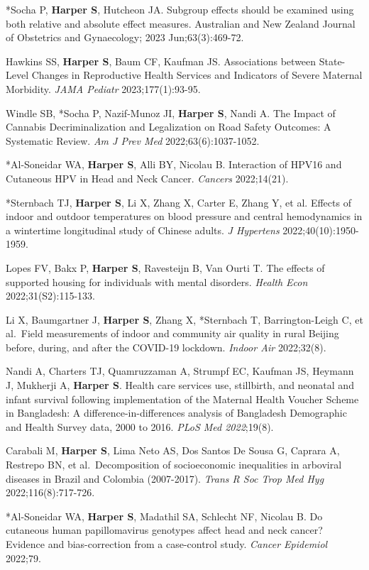 \documentclass[
  letterpaper,
  DIV=11,
  numbers=noendperiod]{scrartcl}
\begin{document}
*Socha P, \textbf{Harper S}, Hutcheon JA. Subgroup effects should be
examined using both relative and absolute effect measures. Australian
and New Zealand Journal of Obstetrics and Gynaecology; 2023
Jun;63(3):469-72.

Hawkins SS, \textbf{Harper S}, Baum CF, Kaufman JS. Associations between
State-Level Changes in Reproductive Health Services and Indicators of
Severe Maternal Morbidity. \emph{JAMA Pediatr} 2023;177(1):93-95.

Windle SB, *Socha P, Nazif-Munoz JI, \textbf{Harper S}, Nandi A. The
Impact of Cannabis Decriminalization and Legalization on Road Safety
Outcomes: A Systematic Review. \emph{Am J Prev Med}
2022;63(6):1037-1052.

*Al-Soneidar WA, \textbf{Harper S}, Alli BY, Nicolau B. Interaction of
HPV16 and Cutaneous HPV in Head and Neck Cancer. \emph{Cancers}
2022;14(21).

*Sternbach TJ, \textbf{Harper S}, Li X, Zhang X, Carter E, Zhang Y, et
al. Effects of indoor and outdoor temperatures on blood pressure and
central hemodynamics in a wintertime longitudinal study of Chinese
adults. \emph{J Hypertens} 2022;40(10):1950-1959.

Lopes FV, Bakx P, \textbf{Harper S}, Ravesteijn B, Van Ourti T. The
effects of supported housing for individuals with mental disorders.
\emph{Health Econ} 2022;31(S2):115-133.

Li X, Baumgartner J, \textbf{Harper S}, Zhang X, *Sternbach T,
Barrington-Leigh C, et al.~Field measurements of indoor and community
air quality in rural Beijing before, during, and after the COVID-19
lockdown. \emph{Indoor Air} 2022;32(8).

Nandi A, Charters TJ, Quamruzzaman A, Strumpf EC, Kaufman JS, Heymann J,
Mukherji A, \textbf{Harper S}. Health care services use, stillbirth, and
neonatal and infant survival following implementation of the Maternal
Health Voucher Scheme in Bangladesh: A difference-in-differences
analysis of Bangladesh Demographic and Health Survey data, 2000 to 2016.
\emph{PLoS Med 2022};19(8).

Carabali M, \textbf{Harper S}, Lima Neto AS, Dos Santos De Sousa G,
Caprara A, Restrepo BN, et al.~Decomposition of socioeconomic
inequalities in arboviral diseases in Brazil and Colombia (2007-2017).
\emph{Trans R Soc Trop Med Hyg} 2022;116(8):717-726.

*Al-Soneidar WA, \textbf{Harper S}, Madathil SA, Schlecht NF, Nicolau B.
Do cutaneous human papillomavirus genotypes affect head and neck cancer?
Evidence and bias-correction from a case-control study. \emph{Cancer
Epidemiol} 2022;79.
\end{document}
